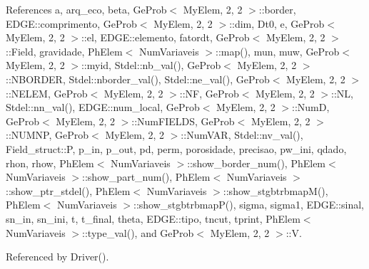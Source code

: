 References a, arq\+\_\+eco, beta, Ge\+Prob$<$ My\+Elem, 2, 2 $>$\+::border, E\+D\+G\+E\+::comprimento, Ge\+Prob$<$ My\+Elem, 2, 2 $>$\+::dim, Dt0, e, Ge\+Prob$<$ My\+Elem, 2, 2 $>$\+::el, E\+D\+G\+E\+::elemento, fatordt, Ge\+Prob$<$ My\+Elem, 2, 2 $>$\+::\+Field, gravidade, Ph\+Elem$<$ Num\+Variaveis $>$\+::map(), mun, muw, Ge\+Prob$<$ My\+Elem, 2, 2 $>$\+::myid, Stdel\+::nb\+\_\+val(), Ge\+Prob$<$ My\+Elem, 2, 2 $>$\+::\+N\+B\+O\+R\+D\+ER, Stdel\+::nborder\+\_\+val(), Stdel\+::ne\+\_\+val(), Ge\+Prob$<$ My\+Elem, 2, 2 $>$\+::\+N\+E\+L\+EM, Ge\+Prob$<$ My\+Elem, 2, 2 $>$\+::\+NF, Ge\+Prob$<$ My\+Elem, 2, 2 $>$\+::\+NL, Stdel\+::nn\+\_\+val(), E\+D\+G\+E\+::num\+\_\+local, Ge\+Prob$<$ My\+Elem, 2, 2 $>$\+::\+NumD, Ge\+Prob$<$ My\+Elem, 2, 2 $>$\+::\+Num\+F\+I\+E\+L\+DS, Ge\+Prob$<$ My\+Elem, 2, 2 $>$\+::\+N\+U\+M\+NP, Ge\+Prob$<$ My\+Elem, 2, 2 $>$\+::\+Num\+V\+AR, Stdel\+::nv\+\_\+val(), Field\+\_\+struct\+::P, p\+\_\+in, p\+\_\+out, pd, perm, porosidade, precisao, pw\+\_\+ini, qdado, rhon, rhow, Ph\+Elem$<$ Num\+Variaveis $>$\+::show\+\_\+border\+\_\+num(), Ph\+Elem$<$ Num\+Variaveis $>$\+::show\+\_\+part\+\_\+num(), Ph\+Elem$<$ Num\+Variaveis $>$\+::show\+\_\+ptr\+\_\+stdel(), Ph\+Elem$<$ Num\+Variaveis $>$\+::show\+\_\+stgbtrbmap\+M(), Ph\+Elem$<$ Num\+Variaveis $>$\+::show\+\_\+stgbtrbmap\+P(), sigma, sigma1, E\+D\+G\+E\+::sinal, sn\+\_\+in, sn\+\_\+ini, t, t\+\_\+final, theta, E\+D\+G\+E\+::tipo, tncut, tprint, Ph\+Elem$<$ Num\+Variaveis $>$\+::type\+\_\+val(), and Ge\+Prob$<$ My\+Elem, 2, 2 $>$\+::V.



Referenced by Driver().

